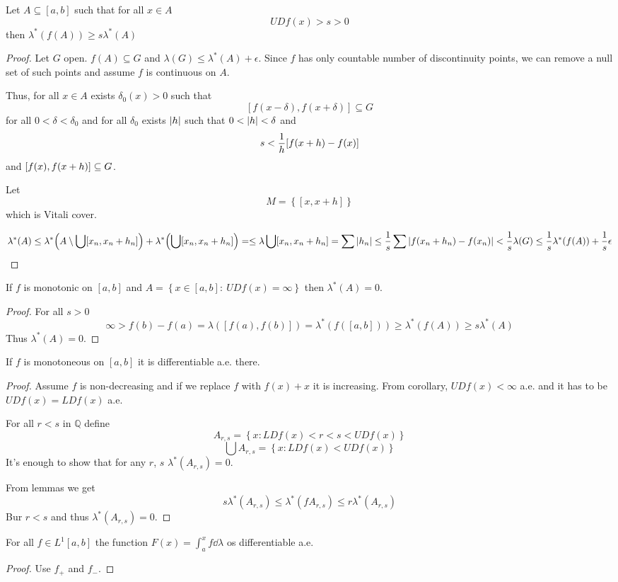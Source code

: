 \begin{lemma}
	Let $A\subseteq [a,b]$ such that for all $x\in A$ 
	$$UD f(x) > s>0$$
	then $\lambda^*(f(A)) \geq s \lambda^*(A)$
	\begin{proof}
		Let $G$ open. $f(A) \subseteq G$ and $\lambda(G) \leq \lambda^*(A)+\epsilon$.
		Since $f$ has only countable number of discontinuity points,  we can remove a null set of such points and assume $f$ is continuous on $A$.
		
		Thus, for all $x \in A$ exists $\delta_0(x) > 0$ such that 
		$$[f(x-\delta), f(x+\delta)] \subseteq G$$
		for all $0<\delta < \delta_0$ and for all $\delta_0$ exists $\abs{h}$ such that
		$0<\abs{h} < \delta$ and 
		$$s < \frac{1}{h} \qty[f(x+h) - f(x)] $$
		and $\qty[ f(x),f(x+h) ] \subseteq G$.
		
		Let 
		$$M = \left\{ [x,x+h]  \right\}$$
		which is Vitali cover.
		
		$$\lambda^*(A) \leq \lambda^*\qty(A \setminus \bigcup [x_n, x_n+h_n]) + \lambda^*\qty(\bigcup [x_n, x_n+h_n]) =\leq \lambda \bigcup [x_n, x_n+h_n] = \sum \abs{h_n} \leq \frac{1}{s} \sum \abs{f(x_n+h_n) - f(x_n) } < \frac{1}{s} \lambda(G) \leq \frac{1}{s} \lambda^*(f(A)) + \frac{1}{s} \epsilon$$
	\end{proof}

\begin{coll}
	If $f$ is monotonic on $[a,b]$ and $A = \left\{ x\in[a,b] : \: UD f(x) =\infty \right\}$ then $\lambda^*(A) = 0$.
	\begin{proof}
		For all $s>0$
		$$\infty > f(b)-f(a) = \lambda([f(a),f(b)]) = \lambda^*(f([a,b])) \geq \lambda^*(f(A) ) \geq s\lambda^*(A)$$
		Thus $\lambda^*(A) = 0$.
	\end{proof}
\end{coll}
\end{lemma}

\begin{theorem}[Lebesgue]
	If $f$ is monotoneous on $[a,b]$ it is differentiable a.e. there.
	\begin{proof}
		Assume $f$ is non-decreasing and if we replace $f$ with $f(x)+x$ it is increasing.
		From corollary, $UD f(x) < \infty$ a.e. and it has to be $UD f(x) = LD f(x)$ a.e.
		
		For all $r<s$ in $\mathbb{Q}$ define
		$$A_{r,s} = \left\{ x: LD f(x) < r <s<UD f(x) \right\}$$
		$$\bigcup A_{r,s} = \left\{ x: LD f(x) <UD f(x) \right\}$$
		It's enough to show that for any $r$, $s$ $\lambda^*(A_{r,s}) = 0$.
		
		From lemmas we get
		$$s\lambda^*(A_{r,s}) \leq \lambda^*(fA_{r,s}) \leq r \lambda^*(A_{r,s})$$
		Bur $r<s$ and thus $\lambda^*(A_{r,s}) =0$.
	\end{proof}
\begin{coll}
	For all $f\in L^1[a,b]$ the function $F(x) = \int_a^x f \dd{\lambda}$ os differentiable a.e.
	\begin{proof}
		Use $f_+$ and $f_-$.
	\end{proof}
\end{coll}
\end{theorem}

